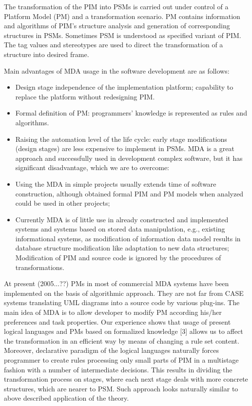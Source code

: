 \documentclass{intech}
\begin{document}
The transformation of the PIM into PSMs is carried out under control of a Platform Model (PM) and a transformation scenario. PM contains information and algorithms of PIM’s structure analysis and generation of corresponding structures in PSMs. Sometimes PSM is understood as specified variant of PIM. The tag values and stereotypes are used to direct the transformation of a structure into desired frame.

Main advantages of MDA usage in the software development are as follows:
\begin{itemize}
\item Design stage independence of the implementation platform; capability to replace the platform without redesigning PIM.

\item Formal definition of PM: programmers’ knowledge is
represented as rules and algorithms.

\item Raising the automation level of the life cycle: early stage modifications (design stages) are less expensive to implement in PSMs. MDA is a great approach and successfully used in development complex software, but it has significant disadvantage, which we are to overcome:

\item Using the MDA in simple projects usually extends time of software construction, although obtained formal PIM and PM models when analyzed could be used in other projects;

\item Currently MDA is of little use in already constructed and implemented systems and systems based on stored data manipulation, e.g., existing informational systems, as modification of information data model results in database structure modification like adaptation to new data structures; Modification of PIM and source code is ignored by the procedures of transformations.
\end{itemize}

At present (2005...??) PMs in most of commercial MDA systems have been implemented on the basis of algorithmic approach. They are not far from CASE systems translating UML diagrams into a source code by various plug-ins. The main idea of MDA is to allow developer to modify PM according his/her preferences and task properties. Our experience shows that usage of present logical languages and PMs based on formalized knowledge [3] allows us to affect the transformation in an efficient way by means of changing a rule set content. Moreover, declarative paradigm of the logical languages naturally forces programmer to create rules processing only small parts of PIM in a multistage fashion with a number of intermediate decisions. This results in dividing the transformation process on stages, where each next stage deals with more concrete structures, which are nearer to PSM. Such approach looks naturally similar to above described application of the theory.
\end{document}
